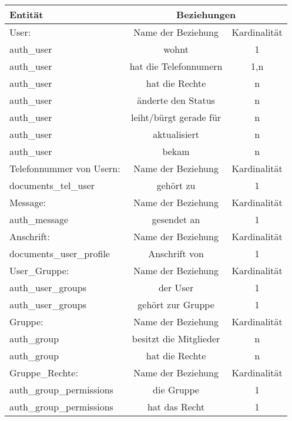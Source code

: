 \begin{tabular}[ht]{|l||c|c|}
  \hline
  Entit\"at & \multicolumn{2}{c|}{Beziehungen} \\
  \hline\hline\hline
    
  User: & Name der Beziehung & Kardinalität\\
  \hline\hline
  auth\_user & wohnt & 1\\
  \hline
  auth\_user & hat die Telefonnumern & 1,n\\
  \hline
  auth\_user & hat die Rechte & n\\
  \hline
  auth\_user & änderte den Status & n\\  
  \hline
  auth\_user & leiht/bürgt gerade für & n\\
  \hline
  auth\_user & aktualisiert & n\\
  \hline
  auth\_user & bekam & n\\
  \hline\hline\hline
  
  Telefonnummer von Usern:  & Name der Beziehung &  Kardinalit\"at\\
  \hline\hline
  documents\_tel\_user & gehört zu & 1 \\
  \hline\hline\hline 
  
  Message: & Name der Beziehung &  Kardinalit\"at\\
  \hline\hline
  auth\_message & gesendet an & 1 \\
  \hline\hline\hline 
  
  Anschrift:  & Name der Beziehung &  Kardinalit\"at\\
  \hline\hline
  documents\_user\_profile & Anschrift von & 1 \\
  \hline\hline\hline
  
  User\_Gruppe:  & Name der Beziehung &  Kardinalit\"at\\
  \hline\hline
  auth\_user\_groups & der User & 1 \\
  \hline
  auth\_user\_groups & gehört zur Gruppe & 1 \\
  \hline\hline\hline
  
  Gruppe: & Name der Beziehung &  Kardinalit\"at\\
  \hline\hline
  auth\_group & besitzt die Mitglieder & n \\
  \hline
  auth\_group & hat die Rechte & n \\
  \hline\hline\hline 

  Gruppe\_Rechte: & Name der Beziehung &  Kardinalit\"at\\
  \hline\hline
  auth\_group\_permissions & die Gruppe & 1 \\
  \hline
  auth\_group\_permissions & hat das Recht & 1 \\
  \hline\hline\hline 
  

\end{tabular}
